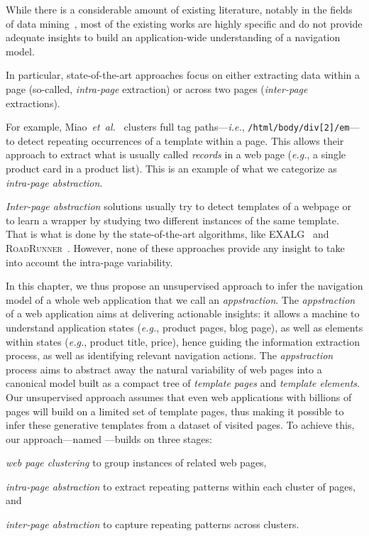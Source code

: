 While there is a considerable amount of existing literature, notably in the fields of data mining~\cite{Zhai2005WebAlignment, ArasuExtractingPages, Crescenzi2001RoadRunner:Sites, Sarawagi1996InformationExtraction, ChaudhariTemplatePages, MiaoExtractingClustering}, most of the existing works are highly specific and do not provide adequate insights to build an application-wide understanding of a navigation model.

In particular, state-of-the-art approaches focus on either extracting data within a page (so-called, \emph{intra-page} extraction) or across two pages (\emph{inter-page} extractions). 

For example, Miao~\textit{et~al.}~\cite{MiaoExtractingClustering} clusters full tag paths---\emph{i.e.}, \texttt{/html/body/div[2]/em}---to detect repeating occurrences of a template within a page.
This allows their approach to extract what is usually called \emph{records} in a web page (\emph{e.g.}, a single product card in a product list).
This is an example of what we categorize as \emph{intra-page abstraction}.

\emph{Inter-page abstraction} solutions usually try to detect templates of a webpage or to learn a wrapper by studying two different instances of the same template.
That is what is done by the state-of-the-art algorithms, like EXALG~\cite{ArasuExtractingPages} and \textsc{RoadRunner}~\cite{Crescenzi2001RoadRunner:Sites}.
However, none of these approaches provide any insight to take into account the intra-page variability.

In this chapter, we thus propose an unsupervised approach to infer the navigation model of a whole web application that we call an \textit{appstraction}.
The \textit{appstraction} of a web application aims at delivering actionable insights: it allows a machine to understand application states (\emph{e.g.}, product pages, blog page), as well as elements within states (\emph{e.g.}, product title, price), hence guiding the information extraction process, as well as identifying relevant navigation actions.
The \textit{appstraction} process aims to abstract away the natural variability of web pages into a canonical model built as a compact tree of \emph{template pages} and \emph{template elements}.
Our unsupervised approach assumes that even web applications with billions of pages will build on a limited set of template pages, thus making it possible to infer these generative templates from a dataset of visited pages.
To achieve this, our approach---named \textsc{\appstract{}}---builds on three stages:
\begin{inparaenum}
    \item \textit{web page clustering} to group instances of related web pages,
    \item \textit{intra-page abstraction} to extract repeating patterns within each cluster of pages, and
    \item \textit{inter-page abstraction} to capture repeating patterns across clusters.
\end{inparaenum}

